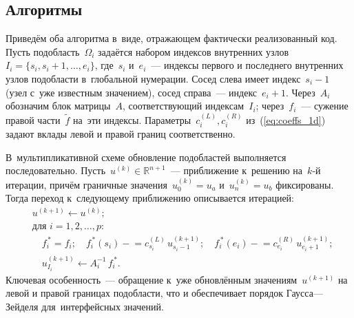 \subsection{Алгоритмы}

Приведём оба алгоритма в~виде, отражающем фактически реализованный код.
Пусть подобласть~$\Omega_i$ задаётся набором индексов внутренних узлов
$I_i=\{s_i, s_i+1, \dots, e_i\}$, где~$s_i$ и~$e_i$~--- индексы первого и
последнего внутренних узлов подобласти в~глобальной нумерации. Сосед слева
имеет индекс~$s_i-1$ (узел с~уже известным значением), сосед справа~---
индекс~$e_i+1$. Через~$A_i$ обозначим блок матрицы~$A$, соответствующий
индексам~$I_i$; через~$f_i$~--- сужение правой части~$\tilde{f}$ на~эти
индексы. Параметры~$c^{(L)}_i, c^{(R)}_i$ из~(\ref{eq:coeffs_1d}) задают
вклады левой и правой границ соответственно.

В~мультипликативной схеме обновление подобластей выполняется
последовательно. Пусть~$u^{(k)}\in\mathbb{R}^{n+1}$~--- приближение к~решению
на~$k$-й итерации, причём граничные значения~$u^{(k)}_0=u_a$ и~$u^{(k)}_n=u_b$
фиксированы. Тогда переход к~следующему приближению описывается итерацией:
\begin{equation}\label{eq:mult_method}
	\begin{aligned}
		 & u^{(k+1)} \leftarrow u^{(k)};                                \\
		 & \text{для~} i = 1, 2, \dots, p:                              \\
		 & \quad
		f_i^{\,*} = f_i;\quad
		f_i^{\,*}(s_i) \mathrel{-}= c^{(L)}_{s_i}\,u^{(k+1)}_{s_i - 1};\quad
		f_i^{\,*}(e_i) \mathrel{-}= c^{(R)}_{e_i}\,u^{(k+1)}_{e_i + 1}; \\
		 & \quad
		u^{(k+1)}_{I_i} \leftarrow A_i^{-1}\,f_i^{\,*}.
	\end{aligned}
\end{equation}
Ключевая особенность~--- обращение к~уже обновлённым значениям~$u^{(k+1)}$ на
левой и правой границах подобласти, что и обеспечивает порядок Гаусса---Зейделя
для~интерфейсных значений.

